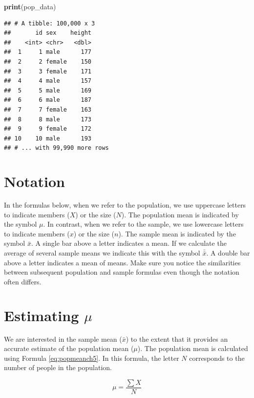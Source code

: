 \documentclass[
]{krantz}
\makeatletter
\newenvironment{Shaded}{\begin{snugshade}}{\end{snugshade}}
\newcommand{\KeywordTok}[1]{\textcolor[rgb]{0.27,0.27,0.27}{\textbf{#1}}}
\newcommand{\NormalTok}[1]{#1}
\newenvironment{kframe}{%
\medskip{}
\setlength{\fboxsep}{.8em}
 \def\at@end@of@kframe{}%
 \ifinner\ifhmode%
  \def\at@end@of@kframe{\end{minipage}}%
  \begin{minipage}{\columnwidth}%
 \fi\fi%
 \def\FrameCommand##1{\hskip\@totalleftmargin \hskip-\fboxsep
 \colorbox{shadecolor}{##1}\hskip-\fboxsep
     \hskip-\linewidth \hskip-\@totalleftmargin \hskip\columnwidth}%
 \MakeFramed {\advance\hsize-\width
   \@totalleftmargin\z@ \linewidth\hsize
   \@setminipage}}%
 {\par\unskip\endMakeFramed%
 \at@end@of@kframe}
\renewenvironment{Shaded}{\begin{kframe}}{\end{kframe}}
\makeatother
\begin{document}
\begin{Shaded}
\begin{Highlighting}[]
\KeywordTok{print}\NormalTok{(pop_data)}
\end{Highlighting}
\end{Shaded}

\begin{verbatim}
## # A tibble: 100,000 x 3
##       id sex    height
##    <int> <chr>   <dbl>
##  1     1 male      177
##  2     2 female    150
##  3     3 female    171
##  4     4 male      157
##  5     5 male      169
##  6     6 male      187
##  7     7 female    163
##  8     8 male      173
##  9     9 female    172
## 10    10 male      193
## # ... with 99,990 more rows
\end{verbatim}

\hypertarget{notation}{%
\section{Notation}\label{notation}}

In the formulas below, when we refer to the population, we use uppercase letters to indicate members (\(X\)) or the size (\(N\)). The population mean is indicated by the symbol \(\mu\). In contrast, when we refer to the sample, we use lowercase letters to indicate members (\(x\)) or the size (\(n\)). The sample mean is indicated by the symbol \(\bar{x}\). A single bar above a letter indicates a mean. If we calculate the average of several sample means we indicate this with the symbol \(\bar{\bar{x}}\). A double bar above a letter indicates a mean of means. Make sure you notice the similarities between subsequent population and sample formulas even though the notation often differs.

\hypertarget{estimating-mu}{%
\section{\texorpdfstring{Estimating \(\mu\)}{Estimating \textbackslash mu}}\label{estimating-mu}}

We are interested in the sample mean (\(\bar{x}\)) to the extent that it provides an accurate estimate of the population mean (\(\mu\)). The population mean is calculated using Formula \eqref{eq:popmeanch5}. In this formula, the letter \(N\) corresponds to the number of people in the population.

\begin{equation} 
\mu = \frac{\sum{X}}{N}
      \label{eq:popmeanch5}
\end{equation}
\end{document}
